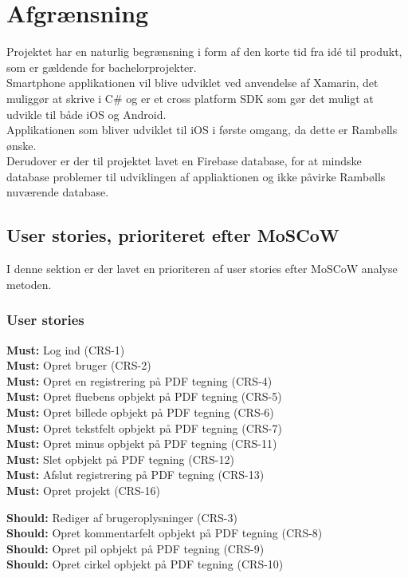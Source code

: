 \section{Afgrænsning}
Projektet har en naturlig begrænsning i form af den korte tid fra idé til produkt, som er gældende for bachelorprojekter.\\
Smartphone applikationen vil blive udviklet ved anvendelse af Xamarin, det muliggør at skrive i C\# og er et cross platform SDK som gør det muligt at udvikle til både iOS og Android. \\
Applikationen som bliver udviklet til iOS i første omgang, da dette er Rambølls ønske. \\
Derudover er der til projektet lavet en Firebase database, for at mindske database problemer til udviklingen af appliaktionen og ikke påvirke Rambølls nuværende database.

\subsection{User stories, prioriteret efter MoSCoW} \label{sec:MoSCoW}
I denne sektion er der lavet en prioriteren af user stories efter MoSCoW analyse metoden.

\subsubsection{User stories}
\textbf{Must:} Log ind (CRS-1) \\
\textbf{Must:} Opret bruger (CRS-2) \\
\textbf{Must:} Opret en registrering på PDF tegning (CRS-4) \\
\textbf{Must:} Opret fluebens opbjekt på PDF tegning (CRS-5) \\
\textbf{Must:} Opret billede opbjekt på PDF tegning (CRS-6) \\
\textbf{Must:} Opret tekstfelt opbjekt på PDF tegning (CRS-7) \\
\textbf{Must:} Opret minus opbjekt på PDF tegning (CRS-11) \\
\textbf{Must:} Slet opbjekt på PDF tegning (CRS-12) \\
\textbf{Must:} Afslut registrering på PDF tegning (CRS-13) \\
\textbf{Must:} Opret projekt (CRS-16) \\

\clearpage

\textbf{Should:} Rediger af brugeroplysninger (CRS-3) \\
\textbf{Should:} Opret kommentarfelt opbjekt på PDF tegning (CRS-8) \\
\textbf{Should:} Opret pil opbjekt på PDF tegning (CRS-9) \\
\textbf{Should:} Opret cirkel opbjekt på PDF tegning (CRS-10) \\


